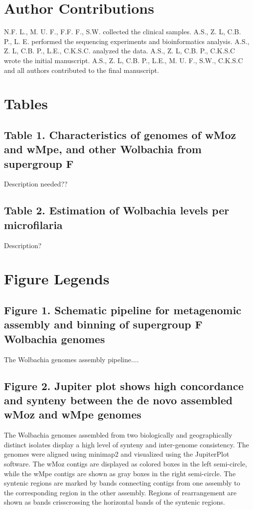 \documentclass[10pt, a4paper, twocolumn]{article} %
\begin{document}
\section{Author Contributions}
N.F. L., M. U. F., F.F. F., S.W. collected the clinical samples. A.S., Z. L, C.B. P., L. E. performed the sequencing experiments and bioinformatics analysis. A.S., Z. L, C.B. P., L.E., C.K.S.C. analyzed the data. A.S., Z. L, C.B. P., C.K.S.C wrote the initial manuscript. A.S., Z. L, C.B. P., L.E., M. U. F., S.W., C.K.S.C and all authors contributed to the final manuscript.

\section{Tables}
\subsection{Table 1. Characteristics of genomes of wMoz and wMpe, and other Wolbachia from supergroup F}
Description needed??

\subsection{Table 2. Estimation of Wolbachia levels per microfilaria}
Description?

\section{Figure Legends}

\subsection{Figure 1. Schematic pipeline for metagenomic assembly and binning of supergroup F Wolbachia genomes}
The Wolbachia genomes assembly pipeline....

\subsection{Figure 2. Jupiter plot shows high concordance and synteny between the de novo assembled wMoz and wMpe genomes}
The Wolbachia genomes assembled from two biologically and geographically distinct isolates display a high level of synteny and inter-genome consistency. The genomes were aligned using minimap2 and visualized using the JupiterPlot software. The wMoz contigs are displayed as colored boxes in the left semi-circle, while the wMpe contigs are shown as gray boxes in the right semi-circle. The syntenic regions are marked by bands connecting contigs from one assembly to the corresponding region in the other assembly. Regions of rearrangement are shown as bands crisscrossing the horizontal bands of the syntenic regions.
\end{document}
